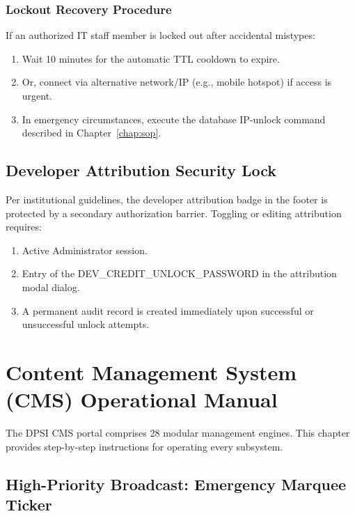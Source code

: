 \documentclass[11pt,a4paper,oneside]{report}
\def\textbf#1{#1}
\def\texttt#1{#1}
\newcommand{\envvar}[1]{\texttt{\textbf{\textcolor{dpsnavy}{#1}}}}
\begin{document}
\subsection{Lockout Recovery Procedure}

If an authorized IT staff member is locked out after accidental mistypes:
\begin{enumerate}
  \item Wait \textbf{10 minutes} for the automatic TTL cooldown to expire.
  \item Or, connect via alternative network/IP (e.g., mobile hotspot) if access is urgent.
  \item In emergency circumstances, execute the database IP-unlock command described in Chapter~\ref{chap:sop}.
\end{enumerate}

\section{Developer Attribution Security Lock}

Per institutional guidelines, the developer attribution badge in the footer is protected
by a secondary authorization barrier. Toggling or editing attribution requires:
\begin{enumerate}
  \item Active Administrator session.
  \item Entry of the \envvar{DEV\_CREDIT\_UNLOCK\_PASSWORD} in the attribution modal dialog.
  \item A permanent audit record is created immediately upon successful or unsuccessful unlock attempts.
\end{enumerate}

\chapter{Content Management System (CMS) Operational Manual}

The DPSI CMS portal comprises \textbf{28 modular management engines}. This chapter provides
step-by-step instructions for operating every subsystem.

\section{High-Priority Broadcast: Emergency Marquee Ticker}
\end{document}
